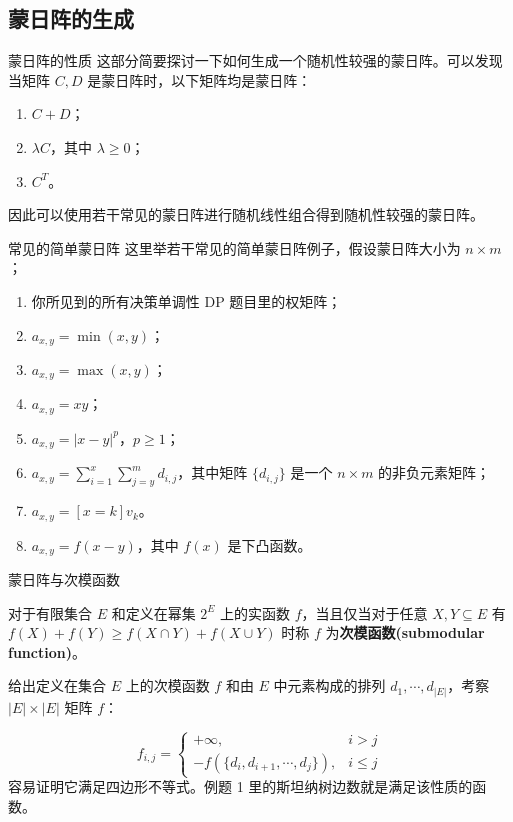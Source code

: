 \documentclass{beamer}
\begin{document}
\subsection{蒙日阵的生成}
\begin{frame}{蒙日阵的性质}
	这部分简要探讨一下如何生成一个随机性较强的蒙日阵。可以发现当矩阵 $C,D$ 是蒙日阵时，以下矩阵均是蒙日阵：
	\begin{enumerate}
		\item $C+D$；
		\item $\lambda C$，其中 $\lambda \geq 0$；
		\item $C^T$。
	\end{enumerate} 
	因此可以使用若干常见的蒙日阵进行随机线性组合得到随机性较强的蒙日阵。
\end{frame}
\begin{frame}{常见的简单蒙日阵}
	这里举若干常见的简单蒙日阵例子，假设蒙日阵大小为 $n \times m$；
	\begin{enumerate}
		\item 你所见到的所有决策单调性 DP 题目里的权矩阵；
		\item $a_{x,y} = \min(x,y)$；
		\item $a_{x,y} = \max(x,y)$；
		\item $a_{x,y}=xy$；
		\item $a_{x,y} = |x-y|^p$，$p \geq 1$；
		\item $a_{x,y} = \sum_{i=1}^x \sum_{j=y}^m d_{i,j}$，其中矩阵 $\{d_{i,j}\}$ 是一个 $n \times m$ 的非负元素矩阵；
		\item $a_{x,y} = [x=k]v_k$。
		\item $a_{x,y} = f(x-y)$，其中 $f(x)$ 是下凸函数。
	\end{enumerate}
\end{frame}
\begin{frame}{蒙日阵与次模函数}
	\begin{definition}[次模函数]
		对于有限集合 $E$ 和定义在幂集 $2^E$ 上的实函数 $f$，当且仅当对于任意 $X,Y \subseteq E$ 有 $f(X)+f(Y) \geq f(X \cap Y) + f(X \cup Y)$ 时称 $f$ 为\textbf{次模函数(submodular function)}。
	\end{definition}
	给出定义在集合 $E$ 上的次模函数 $f$ 和由 $E$ 中元素构成的排列 $d_1,\cdots,d_{|E|}$，考察 $|E| \times |E|$ 矩阵 $f$：
	
	$$f_{i,j} = \begin{cases}
	+\infty, & i > j \\
	-f(\{d_i,d_{i+1},\cdots,d_j\}),& i \leq j
	\end{cases}$$
	容易证明它满足四边形不等式。例题 1 里的斯坦纳树边数就是满足该性质的函数。
\end{frame}
\end{document}
